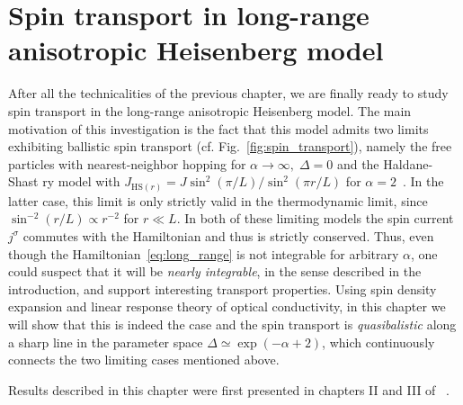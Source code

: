 \chapter{Spin transport in long-range anisotropic Heisenberg model\label{chap:spin_transport}}
\thispagestyle{chapterBeginStyle}

After all the technicalities of the previous chapter, we are finally ready to study spin transport in
the long-range anisotropic Heisenberg model. The main motivation of this investigation is the fact that this model admits 
two limits exhibiting ballistic spin transport (cf. Fig.~\ref{fig:spin_transport}), namely the free particles
with nearest-neighbor hopping for \(\alpha\to \infty,\; \Delta = 0\) and the Haldane-Shast ry
model with \(J_{\mathrm{HS}(r)} = J \sin^2\left(\pi/L\right)/\sin^2\left(\pi r/L\right)\)
 for \(\alpha = 2\)~\autocite{Haldane1988,Shastry1988}. In the latter case, this limit is only strictly valid
 in the thermodynamic limit, since \(\sin^{-2}\left(r/L\right)\propto r^{-2}\) for \(r \ll L\).
 In both of these limiting models the spin current 
\(j^{\sigma}\) commutes with the Hamiltonian and thus is strictly conserved. Thus, even though
the Hamiltonian~\eqref{eq:long_range} is not integrable for arbitrary \(\alpha\), one could suspect
that it will be \textit{nearly integrable}, in the sense described in the introduction, and support
interesting transport properties. Using spin density expansion and linear response theory
of optical conductivity, in this chapter we will show that this is indeed the case and the spin transport is \textit{quasibalistic} along a sharp
line in the parameter space \(\Delta \simeq \exp(- \alpha + 2)\), which continuously connects the two limiting
cases mentioned above.

Results described in this chapter were first presented in chapters II and III of ~\textcite{Mierzejewski2023}.

